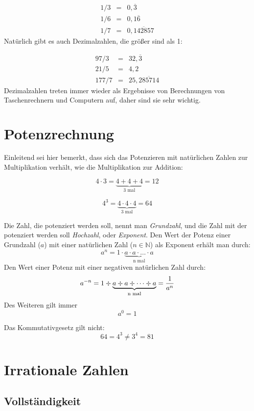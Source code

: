 \begin{eqnarray*}
1/3 &=& 0,\overline{3} \\
1/6 &=& 0,1\overline{6} \\
1/7 &=& 0,\overline{142857}
\end{eqnarray*}
Natürlich gibt es auch Dezimalzahlen, die größer sind als 1:

\begin{eqnarray*}
97/3 &=& 32,\overline{3} \\
21/5 &=& 4,2 \\
177/7 &=& 25,\overline{285714}
\end{eqnarray*}
Dezimalzahlen treten immer wieder als Ergebnisse von Berechnungen von Taschenrechnern und Computern auf, daher sind sie sehr wichtig. 


\section{Potenzrechnung}

Einleitend sei hier bemerkt, dass sich das Potenzieren mit natürlichen Zahlen zur Multiplikation verhält, wie die Multiplikation zur Addition:

\[ 4\cdot 3 = \underbrace{4+4+4}_{\text{3 mal}} = 12 \]

\[ 4^3 = \underbrace{4\cdot 4\cdot 4}_{\text{3 mal}} = 64 \]

\begin{definition}
Die Zahl, die potenziert werden soll, nennt man \textsl{Grundzahl}, und die Zahl mit der potenziert werden soll \textsl{Hochzahl}, oder \textsl{Exponent}. Den Wert der Potenz einer Grundzahl ($a$) mit einer natürlichen Zahl ($n \in \mathbb{N}$) als Exponent erhält man durch:
\[ a^n = 1\cdot \underbrace{a\cdot a \cdot \dots \cdot a}_{\text{n mal}} \]
Den Wert einer Potenz mit einer negativen natürlichen Zahl durch:
\[ a^{-n} = 1 \div \underbrace{a\div a \div \dots \div a}_{\text{n mal}} = {1 \over a^n} \]
Des Weiteren gilt immer
\[ a^0 = 1\]
\end{definition}
Das Kommutativgesetz gilt nicht:
\[ 64 = 4^3 \ne 3^4 = 81 \]



\section{Irrationale Zahlen}



\subsection{Vollständigkeit}

